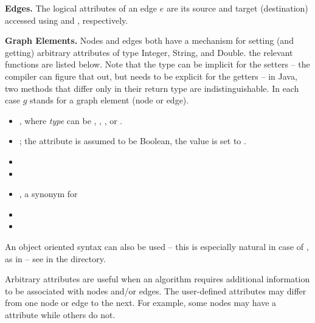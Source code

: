 \bigskip
\textbf{Edges.}
The logical attributes of an edge $e$ are its source and target (destination)
accessed using  and , respectively.

\bigskip
\textbf{Graph Elements.}
Nodes and edges both have a mechanism for setting (and getting)
arbitrary attributes of type Integer, String, and Double.
the relevant functions are listed below.
Note that the type can be implicit for the setters -- the compiler can figure
that out, but needs to be explicit for the getters -- in Java, two methods
that differ only in their return type are indistinguishable.
In each case $g$ stands for a graph element (node or edge).
\begin{itemize}
  \item {},
    where \emph{type} can be , , ,
    or .
  \item {}; the attribute is assumed to
    be Boolean, the value is set to .
  \item {}
  \item {}
    \item {}, a synonym for
  \item {}
  \item {}
\end{itemize}
An object oriented syntax can also be used -- this is especially natural in
case of , as in  -- see  in the
 directory.

Arbitrary attributes
are useful when an algorithm requires additional information to be
associated with nodes and/or edges.
The user-defined attributes may differ from one node or edge to the next.
For example, some nodes may have a  attribute while others do not.

